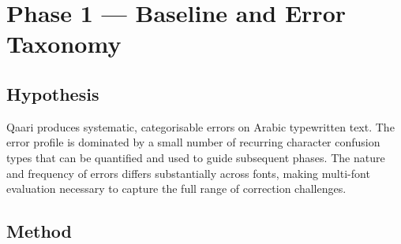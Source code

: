 \section{Phase 1 --- Baseline and Error Taxonomy}
\label{sec:phase1}

\subsection{Hypothesis}
Qaari produces systematic, categorisable errors on Arabic typewritten text.
The error profile is dominated by a small number of recurring character
confusion types that can be quantified and used to guide subsequent phases.
The nature and frequency of errors differs substantially across fonts, making
multi-font evaluation necessary to capture the full range of correction
challenges.

\subsection{Method}
\label{subsec:phase1_method}

